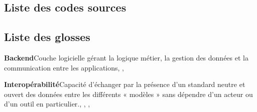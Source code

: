 \documentclass[a4paper,12pt]{article}
\begin{document}
\subsection{Liste des codes sources}
\label{sec:orgcbfcf26}
\renewcommand{\lstlistingname}{\vspace{-2em}}
\lstlistoflistings
\subsection{Liste des glosses}
\label{sec:org27c31b3}
\begin{multicols}{2}\small{
\textbf{\hypertarget{gls-4}{Backend}}\hspace*{1em}Couche logicielle gérant la logique métier, la gestion des données et la communication entre les applications\hspace*{.5em}\pageref{gls-4-use-1}, \pageref{gls-4-use-2}, \pageref{gls-4-use-3}

\textbf{\hypertarget{gls-23}{Interopérabilité}}\hspace*{1em}Capacité d’échanger par la présence d’un standard neutre et ouvert des données entre les différents « modèles » sans dépendre d’un acteur ou d’un outil en particulier.\hspace*{.5em}\pageref{gls-1-use-1}, \pageref{gls-1-use-2}, \pageref{gls-1-use-3}, \pageref{gls-1-use-4}

}\end{multicols}
\end{document}

